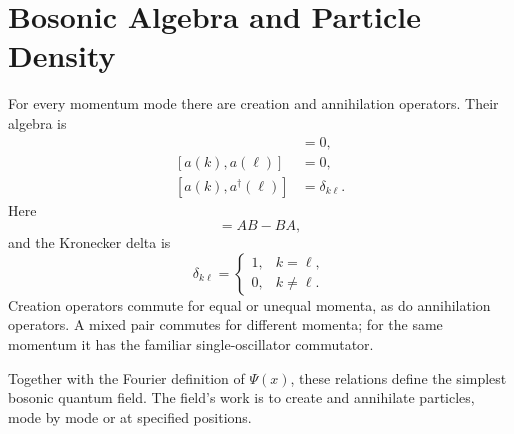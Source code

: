 \section{Bosonic Algebra and Particle Density}

For every momentum mode there are creation and annihilation operators. Their algebra is
\begin{align}
[a^\dagger(k),a^\dagger(\ell)]&=0,\\
[a(k),a(\ell)]&=0,\\
[a(k),a^\dagger(\ell)]&=\delta_{k\ell}.
\end{align}
Here
\begin{equation}
[A,B]=AB-BA,
\end{equation}
and the Kronecker delta is
\begin{equation}
\delta_{k\ell}=
\begin{cases}
1,&k=\ell,\\
0,&k\ne\ell.
\end{cases}
\end{equation}
Creation operators commute for equal or unequal momenta, as do annihilation operators. A mixed pair commutes for different momenta; for the same momentum it has the familiar single-oscillator commutator.

Together with the Fourier definition of \(\Psi(x)\), these relations define the simplest bosonic quantum field. The field's work is to create and annihilate particles, mode by mode or at specified positions.

